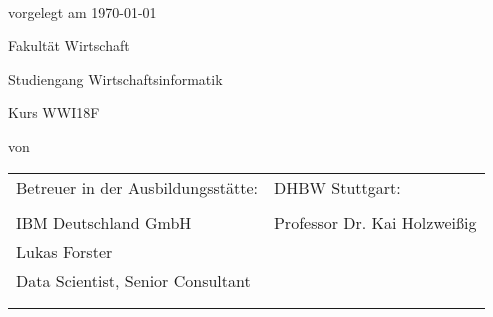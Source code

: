 \begin{spacing}{1}
\begin{center}	
~\vspace{0mm}

{\sffamily
    \LARGE  
    \textbf{\themaMeinerArbeit}
    
    \bigskip
    \textbf{\unterThemaMeinerArbeit}
}

\vspace{15mm}

{\Large \typMeinerArbeit}

\vspace{1cm}

vorgelegt am \today 

\vspace{15mm}

Fakultät Wirtschaft
\medskip

Studiengang Wirtschaftsinformatik
\medskip

Kurs WWI18F 

\vspace{10mm}

von

\vspace{10mm}

{\large\textsc{\meinName}}

\vspace{10mm}
\end{center}

\vfill

\begin{tabular}{ll}
Betreuer in der Ausbildungsstätte: & DHBW Stuttgart: \\
\hspace{0.4\linewidth} & \\
IBM Deutschland GmbH & Professor Dr. Kai Holzweißig \\
Lukas Forster & \\
Data Scientist, Senior Consultant \\
\\
\\
\end{tabular}


\vspace{1cm}
\end{spacing}

